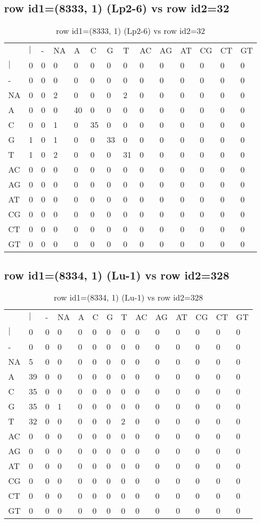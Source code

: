 \subsection{row id1=(8333, 1) (Lp2-6) vs row id2=32}
\begin{center}
\begin{longtable}{|l|l|l|l|l|l|l|l|l|l|l|l|l|l|}
\caption{row id1=(8333, 1) (Lp2-6) vs row id2=32} \label{table_dm332}\\
\hline
\\
\hline
&$|$&-&NA&A&C&G&T&AC&AG&AT&CG&CT&GT\\
$|$&0&0&0&0&0&0&0&0&0&0&0&0&0\\
-&0&0&0&0&0&0&0&0&0&0&0&0&0\\
NA&0&0&2&0&0&0&2&0&0&0&0&0&0\\
A&0&0&0&40&0&0&0&0&0&0&0&0&0\\
C&0&0&1&0&35&0&0&0&0&0&0&0&0\\
G&1&0&1&0&0&33&0&0&0&0&0&0&0\\
T&1&0&2&0&0&0&31&0&0&0&0&0&0\\
AC&0&0&0&0&0&0&0&0&0&0&0&0&0\\
AG&0&0&0&0&0&0&0&0&0&0&0&0&0\\
AT&0&0&0&0&0&0&0&0&0&0&0&0&0\\
CG&0&0&0&0&0&0&0&0&0&0&0&0&0\\
CT&0&0&0&0&0&0&0&0&0&0&0&0&0\\
GT&0&0&0&0&0&0&0&0&0&0&0&0&0\\
\hline
\end{longtable}
\end{center}

\subsection{row id1=(8334, 1) (Lu-1) vs row id2=328}
\begin{center}
\begin{longtable}{|l|l|l|l|l|l|l|l|l|l|l|l|l|l|}
\caption{row id1=(8334, 1) (Lu-1) vs row id2=328} \label{table_dm334}\\
\hline
\\
\hline
&$|$&-&NA&A&C&G&T&AC&AG&AT&CG&CT&GT\\
$|$&0&0&0&0&0&0&0&0&0&0&0&0&0\\
-&0&0&0&0&0&0&0&0&0&0&0&0&0\\
NA&5&0&0&0&0&0&0&0&0&0&0&0&0\\
A&39&0&0&0&0&0&0&0&0&0&0&0&0\\
C&35&0&0&0&0&0&0&0&0&0&0&0&0\\
G&35&0&1&0&0&0&0&0&0&0&0&0&0\\
T&32&0&0&0&0&0&2&0&0&0&0&0&0\\
AC&0&0&0&0&0&0&0&0&0&0&0&0&0\\
AG&0&0&0&0&0&0&0&0&0&0&0&0&0\\
AT&0&0&0&0&0&0&0&0&0&0&0&0&0\\
CG&0&0&0&0&0&0&0&0&0&0&0&0&0\\
CT&0&0&0&0&0&0&0&0&0&0&0&0&0\\
GT&0&0&0&0&0&0&0&0&0&0&0&0&0\\
\hline
\end{longtable}
\end{center}

